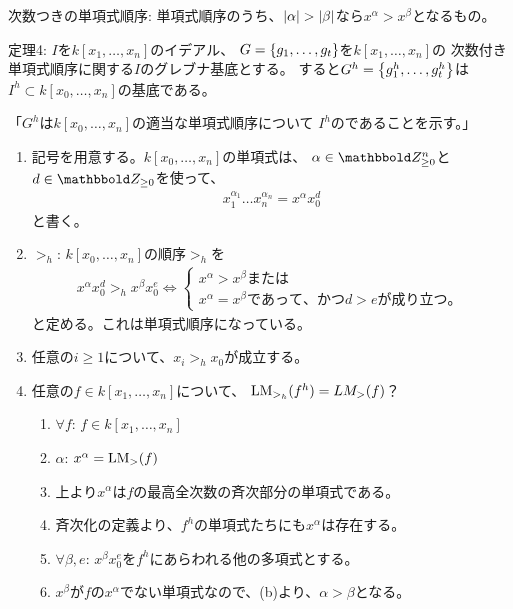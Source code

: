 \begin{framed}
  次数つきの単項式順序:
  単項式順序のうち、$\left|\alpha\right|  > \left|\beta\right|$なら$x^\alpha > x^\beta$となるもの。
\end{framed}

\begin{framed}
  定理4:
  $I$を$k[x_1,\dots,x_n]$のイデアル、
  $G=\left\{g_1,\dots,g_t\right\}$を$k[x_1,\dots,x_n]$の
  次数付き単項式順序に関する$I$のグレブナ基底とする。
  すると$G^h = \left\{g_1^h, \dots, g_t^h\right\}$は
  $I^h\subset k[x_0,\dots,x_n]$の基底である。
\end{framed}
\begin{myproof}
  「$G^h$は$k[x_0,\dots,x_n]$の適当な単項式順序について
  $I^h$のであることを示す。」
  \begin{enumerate}
    \item 記号を用意する。$k[x_0,\dots,x_n]$の単項式は、
    $\alpha \in \Zge^n$と$d\in \Zge$を使って、
    \begin{align}
      x_1^{\alpha_1} \dots x_n^{\alpha_n}
      =
      x^\alpha x_0^d
    \end{align}
    と書く。
    \item
    $>_h$: $k[x_0,\dots,x_n]$の順序$>_h$を
    \begin{align}
      x^\alpha x_0^d >_h x^\beta x_0^e
      \iff
      \begin{cases}
        x^\alpha > x^\beta  または\\
        x^\alpha = x^\beta であって、かつd>eが成り立つ。
      \end{cases}
    \end{align}
    と定める。これは単項式順序になっている。
    \item
    任意の$i\ge 1$について、$x_i >_h x_0$が成立する。
    \item
    任意の$f\in k[x_1,\dots,x_n]$について、
    ${\rm LM}_{>_h}(f^h) = LM_{>}(f)$？
    \begin{enumerate}
      \item $\forall f$: $f\in k[x_1,\dots,x_n]$
      \item $\alpha$: $x^\alpha = {\rm LM}_>(f)$
      \item 上より$x^\alpha$は$f$の最高全次数の斉次部分の単項式である。
      \item 斉次化の定義より、$f^h$の単項式たちにも$x^\alpha$は存在する。
      \item $\forall \beta,e$: $x^\beta x_0^e$を$f^h$にあらわれる他の多項式とする。
      \item $x^\beta$が$f$の$x^\alpha$でない単項式なので、(b)より、$\alpha > \beta$となる。

\end{enumerate}
\end{enumerate}
\end{myproof}

